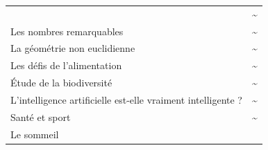 \documentclass[
  10pt,
  french,
  a5paper,
  openany]{book}
\begin{document}
\begin{longtable}[]{@{}lc@{}}
\begin{minipage}[t]{0.88\columnwidth}
\end{minipage} & \begin{minipage}[t]{0.06\columnwidth}\centering
\textasciitilde{}\strut
\end{minipage}\tabularnewline
\begin{minipage}[t]{0.88\columnwidth}\raggedright
Les nombres remarquables\strut
\end{minipage} & \begin{minipage}[t]{0.06\columnwidth}\centering
\textasciitilde{}\strut
\end{minipage}\tabularnewline
\begin{minipage}[t]{0.88\columnwidth}\raggedright
La géométrie non euclidienne\strut
\end{minipage} & \begin{minipage}[t]{0.06\columnwidth}\centering
\textasciitilde{}\strut
\end{minipage}\tabularnewline
\begin{minipage}[t]{0.88\columnwidth}\raggedright
Les défis de l'alimentation\strut
\end{minipage} & \begin{minipage}[t]{0.06\columnwidth}\centering
\textasciitilde{}\strut
\end{minipage}\tabularnewline
\begin{minipage}[t]{0.88\columnwidth}\raggedright
Étude de la biodiversité\strut
\end{minipage} & \begin{minipage}[t]{0.06\columnwidth}\centering
\textasciitilde{}\strut
\end{minipage}\tabularnewline
\begin{minipage}[t]{0.88\columnwidth}\raggedright
L'intelligence artificielle est-elle vraiment intelligente ?\strut
\end{minipage} & \begin{minipage}[t]{0.06\columnwidth}\centering
\textasciitilde{}\strut
\end{minipage}\tabularnewline
\begin{minipage}[t]{0.88\columnwidth}\raggedright
Santé et sport\strut
\end{minipage} & \begin{minipage}[t]{0.06\columnwidth}\centering
\textasciitilde{}\strut
\end{minipage}\tabularnewline
\begin{minipage}[t]{0.88\columnwidth}\raggedright
Le sommeil\strut
\end{minipage} & \begin{minipage}[t]{0.06\columnwidth}\centering

\end{minipage}
\end{longtable}
\end{document}
